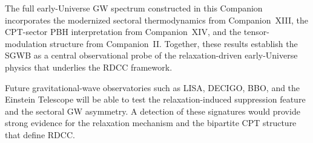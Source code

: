 \documentclass[11pt,a4paper]{article}
\begin{document}
The full early-Universe GW spectrum constructed in this Companion incorporates the
modernized sectoral thermodynamics from Companion~XIII, the CPT-sector PBH interpretation
from Companion~XIV, and the tensor-modulation structure from Companion~II. Together, these
results establish the SGWB as a central observational probe of the relaxation-driven early-Universe
physics that underlies the RDCC framework.

Future gravitational-wave observatories such as LISA, DECIGO, BBO, and the Einstein
Telescope will be able to test the relaxation-induced suppression feature and the sectoral GW
asymmetry. A detection of these signatures would provide strong evidence for the relaxation
mechanism and the bipartite CPT structure that define RDCC.
\end{document}
